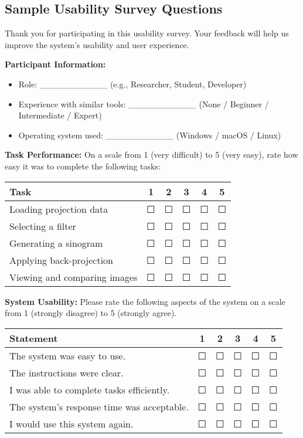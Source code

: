 \documentclass[12pt, titlepage]{article}
\begin{document}
\subsection{Sample Usability Survey Questions}\label{survey}
Thank you for participating in this usability survey. Your feedback will help us improve the system’s usability and user experience.

\textbf{Participant Information:}
\begin{itemize}
    \item Role: \_\_\_\_\_\_\_\_\_\_\_ (e.g., Researcher, Student, Developer)
    \item Experience with similar tools: \_\_\_\_\_\_\_\_\_\_\_ (None / Beginner / Intermediate / Expert)
    \item Operating system used: \_\_\_\_\_\_\_\_\_\_\_ (Windows / macOS / Linux)
\end{itemize}

\textbf{Task Performance:}
On a scale from 1 (very difficult) to 5 (very easy), rate how easy it was to complete the following tasks:
\begin{center}
    \begin{tabular}{|l|c|c|c|c|c|}
        \hline
        \textbf{Task} & 1 & 2 & 3 & 4 & 5 \\
        \hline
        Loading projection data & ☐ & ☐ & ☐ & ☐ & ☐ \\
        Selecting a filter & ☐ & ☐ & ☐ & ☐ & ☐ \\
        Generating a sinogram & ☐ & ☐ & ☐ & ☐ & ☐ \\
        Applying back-projection & ☐ & ☐ & ☐ & ☐ & ☐ \\
        Viewing and comparing images & ☐ & ☐ & ☐ & ☐ & ☐ \\
        \hline
    \end{tabular}
\end{center}

\textbf{System Usability:}
Please rate the following aspects of the system on a scale from 1 (strongly disagree) to 5 (strongly agree).
\begin{center}
    \begin{tabular}{|l|c|c|c|c|c|}
        \hline
        \textbf{Statement} & 1 & 2 & 3 & 4 & 5 \\
        \hline
        The system was easy to use. & ☐ & ☐ & ☐ & ☐ & ☐ \\
        The instructions were clear. & ☐ & ☐ & ☐ & ☐ & ☐ \\
        I was able to complete tasks efficiently. & ☐ & ☐ & ☐ & ☐ & ☐ \\
        The system's response time was acceptable. & ☐ & ☐ & ☐ & ☐ & ☐ \\
        I would use this system again. & ☐ & ☐ & ☐ & ☐ & ☐ \\
        \hline
    \end{tabular}
\end{center}
\end{document}
